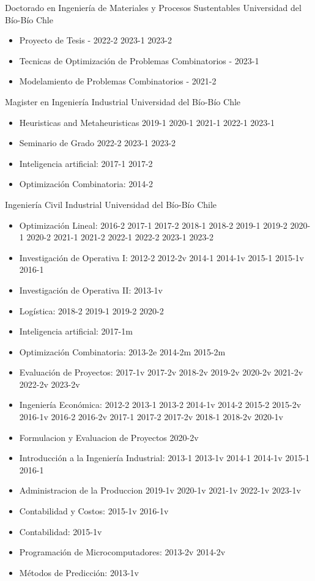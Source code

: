 {Doctorado en Ingenier\'ia de Materiales y Procesos Sustentables}
{Universidad del B\'io-B\'io}
{Chle}
{}
{\begin{itemize}
\item Proyecto de Tesis - 2022-2 2023-1 2023-2
\item Tecnicas de Optimizaci\'on de Problemas Combinatorios - 2023-1
\item Modelamiento de Problemas Combinatorios - 2021-2
\end{itemize}}

{Magister en Ingenier\'ia Industrial}
{Universidad del B\'io-B\'io}
{Chle}
{}
{\begin{itemize}
\item Heuristicas and Metaheuristicas 2019-1 2020-1 2021-1 2022-1 2023-1
\item Seminario de Grado 2022-2 2023-1 2023-2
\item Inteligencia artificial: 2017-1 2017-2
\item Optimizaci\'on Combinatoria: 2014-2
\end{itemize}}

{Ingenier\'ia Civil Industrial}
{Universidad del B\'io-B\'io}
{Chile}
{}
{\begin{itemize}
\item Optimizaci\'on Lineal: 2016-2 2017-1 2017-2 2018-1 2018-2 2019-1 2019-2 2020-1 2020-2 2021-1 2021-2 2022-1 2022-2 2023-1 2023-2
\item Investigaci\'on de Operativa I: 2012-2 2012-2v 2014-1 2014-1v 2015-1 2015-1v 2016-1
\item Investigaci\'on de Operativa II: 2013-1v
\item Log\'istica: 2018-2 2019-1 2019-2 2020-2
\item Inteligencia artificial: 2017-1m
\item Optimizaci\'on Combinatoria: 2013-2e 2014-2m 2015-2m
\item Evaluaci\'on de Proyectos: 2017-1v 2017-2v 2018-2v 2019-2v 2020-2v 2021-2v 2022-2v 2023-2v
\item Ingenier\'ia Econ\'omica: 2012-2 2013-1 2013-2 2014-1v 2014-2 2015-2 2015-2v 2016-1v 2016-2 2016-2v 2017-1 2017-2 2017-2v 2018-1 2018-2v 2020-1v
\item Formulacion y Evaluacion de Proyectos 2020-2v
\item Introducci\'on a la Ingenier\'ia Industrial: 2013-1 2013-1v 2014-1 2014-1v 2015-1 2016-1
\item Administracion de la Produccion 2019-1v 2020-1v 2021-1v 2022-1v 2023-1v
\item Contabilidad y Costos: 2015-1v 2016-1v
\item Contabilidad: 2015-1v
\item Programaci\'on de Microcomputadores: 2013-2v 2014-2v
\item M\'etodos de Predicci\'on: 2013-1v
\end{itemize}}

